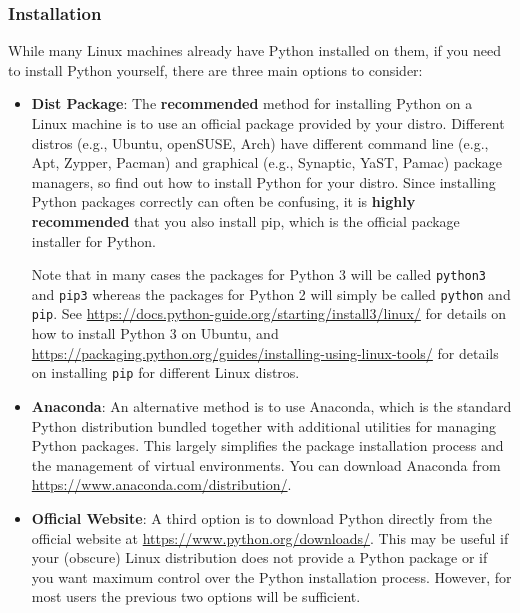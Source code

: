 \documentclass[12pt]{article}
\begin{document}
\subsubsection{Installation}
While many Linux machines already have Python installed on them, if you need to install Python yourself, there are three main options to consider:
\begin{itemize}
    \item \textbf{Dist Package}: The \textbf{recommended} method for installing Python on a Linux machine is to use an official package provided by your distro.
        Different distros (e.g., Ubuntu, openSUSE, Arch) have different command line (e.g., Apt, Zypper, Pacman) and graphical (e.g., Synaptic, YaST, Pamac) package managers, so find out how to install Python for your distro.
        Since installing Python packages correctly can often be confusing, it is \textbf{highly recommended} that you also install pip, which is the official package installer for Python.
        
        Note that in many cases the packages for Python 3 will be called \texttt{python3} and \texttt{pip3} whereas the packages for Python 2 will simply be called \texttt{python} and \texttt{pip}.
        See \url{https://docs.python-guide.org/starting/install3/linux/} for details on how to install Python 3 on Ubuntu, and \url{https://packaging.python.org/guides/installing-using-linux-tools/} for details on installing \texttt{pip} for different Linux distros.
    \item \textbf{Anaconda}: An alternative method is to use Anaconda, which is the standard Python distribution bundled together with additional utilities for managing Python packages.
        This largely simplifies the package installation process and the management of virtual environments.
        You can download Anaconda from \url{https://www.anaconda.com/distribution/}.
    \item \textbf{Official Website}: A third option is to download Python directly from the official website at \url{https://www.python.org/downloads/}.
        This may be useful if your (obscure) Linux distribution does not provide a Python package or if you want maximum control over the Python installation process.
        However, for most users the previous two options will be sufficient.
\end{itemize}
\end{document}
